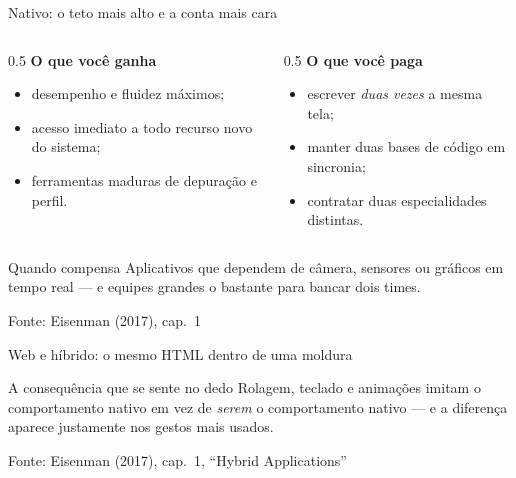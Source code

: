 \documentclass[aspectratio=169]{beamer}
\newcommand{\fonte}[1]{\vfill\hfill{\scriptsize\textcolor{UFSGray}{Fonte: #1}}}
\begin{document}
\begin{frame}{Nativo: o teto mais alto e a conta mais cara}
  \begin{columns}[T]
    \begin{column}{0.5\textwidth}
      \textbf{O que você ganha}
      \begin{itemize}
        \item desempenho e fluidez máximos;
        \item acesso imediato a todo recurso novo do sistema;
        \item ferramentas maduras de depuração e perfil.
      \end{itemize}
    \end{column}
    \begin{column}{0.5\textwidth}
      \textbf{O que você paga}
      \begin{itemize}
        \item escrever \emph{duas vezes} a mesma tela;
        \item manter duas bases de código em sincronia;
        \item contratar duas especialidades distintas.
      \end{itemize}
    \end{column}
  \end{columns}
  \begin{block}{Quando compensa}
    Aplicativos que dependem de câmera, sensores ou gráficos em tempo real ---
    e equipes grandes o bastante para bancar dois times.
  \end{block}
  \fonte{Eisenman (2017), cap.\ 1~\cite{eisenman2017learning}}
\end{frame}

\begin{frame}{Web e híbrido: o mesmo HTML dentro de uma moldura}
  \begin{center}
  \end{center}
  \begin{block}{A consequência que se sente no dedo}
    Rolagem, teclado e animações imitam o comportamento nativo em vez de
    \emph{serem} o comportamento nativo --- e a diferença aparece justamente
    nos gestos mais usados.
  \end{block}
  \fonte{Eisenman (2017), cap.\ 1, ``Hybrid Applications''~\cite{eisenman2017learning}}
\end{frame}
\end{document}
